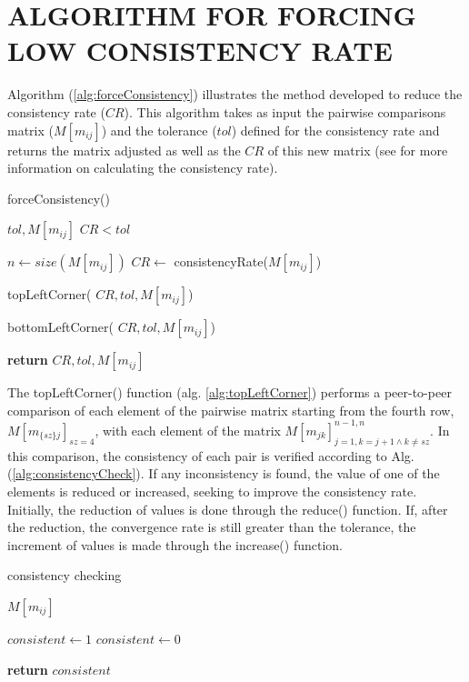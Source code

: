 \documentclass[10pt,fleqn,a4paper,twoside]{article}
\begin{document}
    \section{ALGORITHM FOR FORCING LOW CONSISTENCY RATE}
    
    Algorithm (\ref{alg:forceConsistency}) illustrates the method developed to reduce the consistency rate ($CR$). This algorithm takes as input the pairwise comparisons matrix ($M[m_{ij}]$) and the tolerance ($tol$) defined for the consistency rate and returns the matrix adjusted as well as the $CR$ of this new matrix (see \cite{Saaty1987} for more information on calculating the consistency rate).
    
\begin{algorithm}
\caption{forceConsistency()}\label{alg:forceConsistency}
	\begin{algorithmic}
	\Require $tol, M[m_{ij}]$
	\Ensure $CR < tol$
		
	\State $n \gets size(M[m_{ij}])$
	\State $CR \gets$ consistencyRate($M[m_{ij}]$)
	
	\State topLeftCorner( $CR, tol, M[m_{ij}]$)
	
	\State bottomLeftCorner( $CR, tol, M[m_{ij}]$)
	
	\State \textbf{return} $CR, tol, M[m_{ij}]$
	
\end{algorithmic}
\end{algorithm}

The topLeftCorner() function (alg. \ref{alg:topLeftCorner}) performs a peer-to-peer comparison of each element of the pairwise matrix starting from the fourth row, $M[m_{\{sz\}j}]_{sz=4}$, with each element of the matrix $M[m_{jk}]_{j=1, k=j+1 \land k \neq sz}^{n-1,n}$. In this comparison, the consistency of each pair is verified according to Alg. (\ref{alg:consistencyCheck}). If any inconsistency is found, the value of one of the elements is reduced or increased, seeking to improve the consistency rate. Initially, the reduction of values is done through the reduce() function.  If, after the reduction, the convergence rate is still greater than the tolerance, the increment of values is made through the increase() function.

\begin{algorithm}
\caption{consistency checking}\label{alg:consistencyCheck}
	\begin{algorithmic}
	\Require $M[m_{ij}]$
	
		\State $consistent \gets 1$ 
	\Else
		\State $consistent \gets 0$ 
	\EndIf
	
	\State \textbf{return} $consistent$
	
\end{algorithmic}
\end{algorithm}
\end{document}
